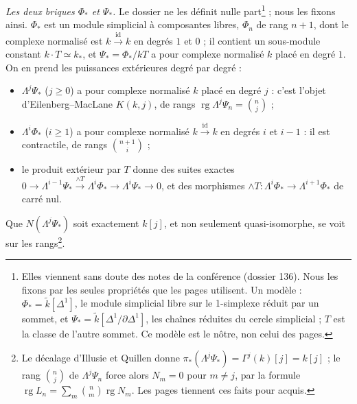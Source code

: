 \documentclass[11pt,a4paper]{article}
\begin{document}
\emph{Les deux briques $\Phi_{*}$ et $\Psi_{*}$.} Le dossier ne les définit
nulle part\footnote{Elles viennent sans doute des notes de la conférence
(dossier 136). Nous les fixons par les seules propriétés que les pages
utilisent. Un modèle : $\Phi_{*} = \widetilde{k}[\Delta^{1}]$, le module
simplicial libre sur le 1-simplexe réduit par un sommet, et
$\Psi_{*} = \widetilde{k}[\Delta^{1}/\partial\Delta^{1}]$, les chaînes
réduites du cercle simplicial ; $T$ est la classe de l'autre sommet. Ce
modèle est le nôtre, non celui des pages.} ; nous les fixons ainsi.
$\Phi_{*}$ est un module simplicial à composantes libres, $\Phi_{n}$ de rang
$n+1$, dont le complexe normalisé est $k \xrightarrow{\mathrm{id}} k$ en
degrés $1$ et $0$ ; il contient un sous-module constant $k \cdot T \simeq
k_{*}$, et $\Psi_{*} = \Phi_{*}/kT$ a pour complexe normalisé $k$ placé en
degré $1$. On en prend les puissances extérieures degré par degré :
\begin{itemize}
\item $\Lambda^{j}\Psi_{*}$ ($j \geqslant 0$) a pour complexe normalisé $k$
placé en degré $j$ : c'est l'objet d'Eilenberg–MacLane $K(k, j)$, de rangs
$\operatorname{rg} \Lambda^{j}\Psi_{n} = \binom{n}{j}$ ;
\item $\Lambda^{i}\Phi_{*}$ ($i \geqslant 1$) a pour complexe normalisé
$k \xrightarrow{\mathrm{id}} k$ en degrés $i$ et $i-1$ : il est contractile,
de rangs $\binom{n+1}{i}$ ;
\item le produit extérieur par $T$ donne des suites exactes
$0 \to \Lambda^{i-1}\Psi_{*} \xrightarrow{\wedge T} \Lambda^{i}\Phi_{*}
\to \Lambda^{i}\Psi_{*} \to 0$, et des morphismes
$\wedge T : \Lambda^{i}\Phi_{*} \to \Lambda^{i+1}\Phi_{*}$ de carré nul.
\end{itemize}
Que $N(\Lambda^{j}\Psi_{*})$ soit exactement $k[j]$, et non seulement
quasi-isomorphe, se voit sur les rangs\footnote{Le décalage d'Illusie et
Quillen donne $\pi_{*}(\Lambda^{j}\Psi_{*}) = \Gamma^{j}(k)[j] = k[j]$ ; le
rang $\binom{n}{j}$ de $\Lambda^{j}\Psi_{n}$ force alors $N_{m} = 0$ pour
$m \neq j$, par la formule
$\operatorname{rg} L_{n} = \sum_{m} \binom{n}{m} \operatorname{rg} N_{m}$.
Les pages tiennent ces faits pour acquis.}.
\end{document}
